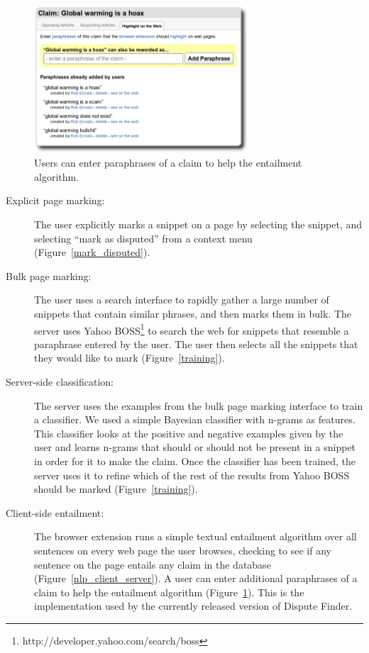 \documentclass{www2010-submission}
\newcommand{\todo}[1]{}
\begin{document}
\begin{figure}[tb]
	\begin{center}
	\includegraphics[width=8cm]{pictures/paraphrases.png}
	\caption{Users can enter paraphrases of a claim to help the entailment algorithm.}
	\label{paraphrases}
	\end{center}
\end{figure}

\begin{description}
\item[Explicit page marking:] The user explicitly marks a snippet on a page by selecting the snippet, and selecting ``mark as disputed'' from a context menu (Figure~\ref{mark_disputed}).

\item[Bulk page marking:] The user uses a search interface to rapidly gather a large number of snippets that contain similar phrases, and then marks them in bulk. The server uses Yahoo BOSS\footnote{http://developer.yahoo.com/search/boss} to search the web for snippets that resemble a paraphrase entered by the user. The user then selects all the snippets that they would like to mark (Figure~\ref{training}).

\item[Server-side classification:] The server uses the examples from the bulk page marking interface to train a classifier. We used a simple Bayesian classifier with n-grams as features. This classifier looks at the positive and negative examples given by the user and learns n-grams that should or should not be present in a snippet in order for it to make the claim.  Once the classifier has been trained, the server uses it to refine which of the rest of the results from Yahoo BOSS should be marked (Figure~\ref{training}).

\todo{Should we say that we didn't completely finish this version?}

\todo{Has anyone done something like this before.}
\todo{We only partially implemented this approach}

\item[Client-side entailment:] The browser extension runs a simple textual entailment algorithm over all sentences on every web page the user browses, checking to see if any sentence on the page entails any claim in the database (Figure~\ref{nlp_client_server}). A user can enter additional paraphrases of a claim to help the entailment algorithm (Figure~\ref{paraphrases}). This is the implementation used by the currently released version of Dispute Finder.
\end{description}
\end{document}
